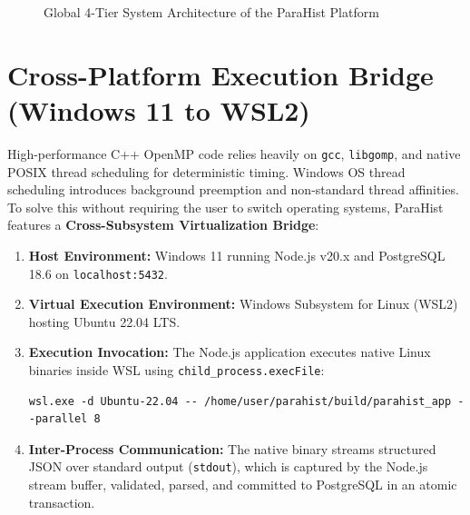 \documentclass[12pt,a4paper,oneside]{report}
\begin{document}
\begin{figure}[h!]
\caption{Global 4-Tier System Architecture of the ParaHist Platform}
\label{fig:system_arch}
\end{figure}

\section{Cross-Platform Execution Bridge (Windows 11 to WSL2)}
High-performance C++ OpenMP code relies heavily on \texttt{gcc}, \texttt{libgomp}, and native POSIX thread scheduling for deterministic timing. Windows OS thread scheduling introduces background preemption and non-standard thread affinities. To solve this without requiring the user to switch operating systems, ParaHist features a \textbf{Cross-Subsystem Virtualization Bridge}:
\begin{enumerate}
    \item \textbf{Host Environment:} Windows 11 running Node.js v20.x and PostgreSQL 18.6 on \texttt{localhost:5432}.
    \item \textbf{Virtual Execution Environment:} Windows Subsystem for Linux (WSL2) hosting Ubuntu 22.04 LTS.
    \item \textbf{Execution Invocation:} The Node.js application executes native Linux binaries inside WSL using \texttt{child\_process.execFile}:
    \begin{verbatim}
wsl.exe -d Ubuntu-22.04 -- /home/user/parahist/build/parahist_app --parallel 8
    \end{verbatim}
    \item \textbf{Inter-Process Communication:} The native binary streams structured JSON over standard output (\texttt{stdout}), which is captured by the Node.js stream buffer, validated, parsed, and committed to PostgreSQL in an atomic transaction.
\end{enumerate}
\end{document}
